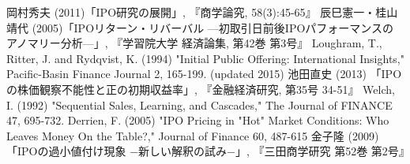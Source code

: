 \documentclass{jsarticle}
\begin{document}
\begin{thebibliography}{99}
 岡村秀夫 (2011)「IPO研究の展開」, 『商学論究, 58(3):45-65』
 辰巳憲一・桂山靖代 (2005)「IPOリターン・リバーバル —初取引日前後IPOパフォーマンスのアノマリー分析—」, 『学習院大学 経済論集, 第42巻 第3号』
 Loughram, T., Ritter, J. and Rydqvist, K. (1994) "Initial Public Offering: International Insights," Pacific-Basin Finance Journal 2, 165-199. (updated 2015)
 池田直史 (2013) 「IPOの株価観察不能性と正の初期収益率」, 『金融経済研究, 第35号 34-51』
 Welch, I. (1992) "Sequential Sales, Learning, and Cascades," The Journal of FINANCE 47, 695-732.
 Derrien, F. (2005) "IPO Pricing in "Hot" Market Conditions: Who Leaves Money On the Table?," Journal of Finance 60, 487-615
 金子隆 (2009) 「IPOの過小値付け現象 −新しい解釈の試み−」, 『三田商学研究 第52巻 第2号』
\end{thebibliography}
\end{document}
